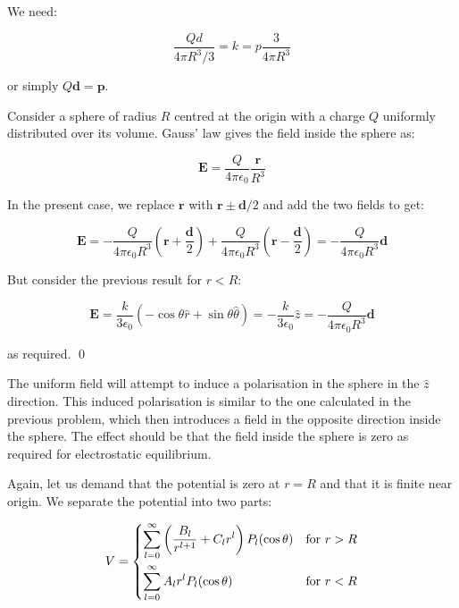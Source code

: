 \documentclass[12pt]{article}
\begin{document}
We need:

\begin{equation}
    \frac{Qd}{4\pi R^{3}/3} = k = p \frac{3}{4\pi R^{3}}
\end{equation}

or simply $Q\mathbf{d} = \mathbf{p}$.

Consider a sphere of radius $R$ centred at the origin with a charge $Q$ uniformly distributed over its volume. Gauss' law gives the field inside the sphere as:

\begin{equation}
    \mathbf{E} = \frac{Q}{4\pi\epsilon_{0}} \frac{\mathbf{r}}{R^{3}}
\end{equation}

In the present case, we replace $\mathbf{r}$ with $\mathbf{r} \pm \mathbf{d}/2$ and add the two fields to get:

\begin{equation}
    \mathbf{E} = -\frac{Q}{4\pi\epsilon_{0}R^{3}} \left( \mathbf{r} + \frac{\mathbf{d}}{2} \right) + \frac{Q}{4\pi\epsilon_{0}R^{3}} \left( \mathbf{r} - \frac{\mathbf{d}}{2} \right) = -\frac{Q}{4\pi\epsilon_{0}R^{3}} \mathbf{d}
\end{equation}

But consider the previous result for $r < R$:

\begin{equation}
    \mathbf{E} = \frac{k}{3\epsilon_{0}} \left( -\cos{\theta} \hat{r} + \sin{\theta} \hat{\theta} \right) = -\frac{k}{3\epsilon_{0}} \hat{z} = -\frac{Q}{4\pi\epsilon_{0}R^{3}} \mathbf{d}
\end{equation}

as required.
\qed



The uniform field will attempt to induce a polarisation in the sphere in the $\hat{z}$ direction. This induced polarisation is similar to the one calculated in the previous problem, which then introduces a field in the opposite direction inside the sphere. The effect should be that the field inside the sphere is zero as required for electrostatic equilibrium.

Again, let us demand that the potential is zero at $r = R$ and that it is finite near origin. We separate the potential into two parts:

\begin{equation}
V =
\begin{dcases}
    \sum_{l=0}^{\infty} \left( \frac{B_{l}}{r^{l+1}} + C_{l} r^{l} \right) P_{l}(\cos{\theta}) & \text{for } r > R \\
    \sum_{l=0}^{\infty} A_{l} r^{l} P_{l}(\cos{\theta}) & \text{for } r < R
\end{dcases}
\end{equation}
\end{document}
